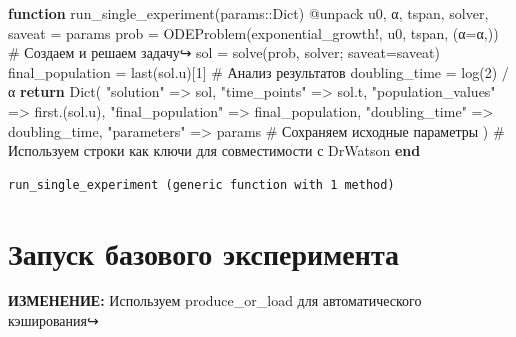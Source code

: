 \documentclass[
  english,
  russian,
  12pt,
  a4paper,
  DIV=11,
  numbers=noendperiod]{scrreprt}
\newenvironment{Shaded}{\begin{snugshade}}{\end{snugshade}}
\newcommand{\CommentTok}[1]{\textcolor[rgb]{0.37,0.37,0.37}{#1}}
\newcommand{\ControlFlowTok}[1]{\textcolor[rgb]{0.00,0.23,0.31}{\textbf{#1}}}
\newcommand{\DataTypeTok}[1]{\textcolor[rgb]{0.68,0.00,0.00}{#1}}
\newcommand{\FloatTok}[1]{\textcolor[rgb]{0.68,0.00,0.00}{#1}}
\newcommand{\FunctionTok}[1]{\textcolor[rgb]{0.28,0.35,0.67}{#1}}
\newcommand{\KeywordTok}[1]{\textcolor[rgb]{0.00,0.23,0.31}{\textbf{#1}}}
\newcommand{\NormalTok}[1]{\textcolor[rgb]{0.00,0.23,0.31}{#1}}
\newcommand{\OperatorTok}[1]{\textcolor[rgb]{0.37,0.37,0.37}{#1}}
\newcommand{\PreprocessorTok}[1]{\textcolor[rgb]{0.68,0.00,0.00}{#1}}
\newcommand{\StringTok}[1]{\textcolor[rgb]{0.13,0.47,0.30}{#1}}
\begin{document}
\begin{Shaded}
\begin{Highlighting}[]
\KeywordTok{function} \FunctionTok{run\_single\_experiment}\NormalTok{(params}\OperatorTok{::}\DataTypeTok{Dict}\NormalTok{)}
\PreprocessorTok{@unpack}\NormalTok{ u0, α, tspan, solver, saveat }\OperatorTok{=}\NormalTok{ params}
\NormalTok{prob }\OperatorTok{=} \FunctionTok{ODEProblem}\NormalTok{(exponential\_growth!, u0, tspan, (α}\OperatorTok{=}\NormalTok{α,)) }\CommentTok{\# Создаем и решаем задачу↪}
\NormalTok{sol }\OperatorTok{=} \FunctionTok{solve}\NormalTok{(prob, solver; saveat}\OperatorTok{=}\NormalTok{saveat)}
\NormalTok{final\_population }\OperatorTok{=} \FunctionTok{last}\NormalTok{(sol.u)[}\FloatTok{1}\NormalTok{] }\CommentTok{\# Анализ результатов}
\NormalTok{doubling\_time }\OperatorTok{=} \FunctionTok{log}\NormalTok{(}\FloatTok{2}\NormalTok{) }\OperatorTok{/}\NormalTok{ α}
\ControlFlowTok{return} \FunctionTok{Dict}\NormalTok{(}
\StringTok{"solution"} \OperatorTok{=\textgreater{}}\NormalTok{ sol,}
\StringTok{"time\_points"} \OperatorTok{=\textgreater{}}\NormalTok{ sol.t,}
\StringTok{"population\_values"} \OperatorTok{=\textgreater{}} \FunctionTok{first}\NormalTok{.(sol.u),}
\StringTok{"final\_population"} \OperatorTok{=\textgreater{}}\NormalTok{ final\_population,}
\StringTok{"doubling\_time"} \OperatorTok{=\textgreater{}}\NormalTok{ doubling\_time,}
\StringTok{"parameters"} \OperatorTok{=\textgreater{}}\NormalTok{ params }\CommentTok{\# Сохраняем исходные параметры}
\NormalTok{) }\CommentTok{\# Используем строки как ключи для совместимости с DrWatson}
\KeywordTok{end}
\end{Highlighting}
\end{Shaded}

\begin{verbatim}
run_single_experiment (generic function with 1 method)
\end{verbatim}

\section{Запуск базового
эксперимента}\label{ux437ux430ux43fux443ux441ux43a-ux431ux430ux437ux43eux432ux43eux433ux43e-ux44dux43aux441ux43fux435ux440ux438ux43cux435ux43dux442ux430}

\textbf{ИЗМЕНЕНИЕ:} Используем produce\_or\_load для автоматического
кэширования↪
\end{document}
